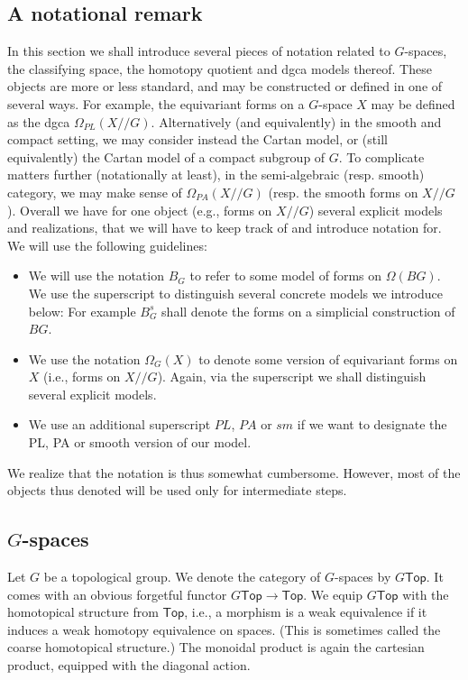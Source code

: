 \documentclass[a4paper]{amsart}
\theoremstyle{plain}
\theoremstyle{definition}
\renewcommand{\Top}{\mathsf{Top}}
\begin{document}
\subsection{A notational remark}
In this section we shall introduce several pieces of notation related to $G$-spaces, the classifying space, the homotopy quotient and dgca models thereof.
These objects are more or less standard, and may be constructed or defined in one of several ways.
For example, the equivariant forms on a $G$-space $X$ may be defined as the dgca $\Omega_{PL}(X//G)$. Alternatively (and equivalently) in the smooth and compact setting, we may consider instead the Cartan model, or (still equivalently) the Cartan model of a compact subgroup of $G$.
To complicate matters further (notationally at least), in the semi-algebraic (resp. smooth) category, we may make sense of $\Omega_{PA}(X//G)$ (resp. the smooth forms on $X//G$).
Overall we have for one object (e.g., forms on $X//G$) several explicit models and realizations, that we will have to keep track of and introduce notation for.
We will use the following guidelines:
\begin{itemize}
 \item We will use the notation $B_G$ to refer to some model of forms on $\Omega(BG)$. We use the superscript to distinguish several concrete models we introduce below: For example $B_G^s$ shall denote the forms on a simplicial construction of $BG$.
\item We use the notation $\Omega_G(X)$ to denote some version of equivariant forms on $X$ (i.e., forms on $X//G$). Again, via the superscript we shall distinguish several explicit models.
\item We use an additional superscript $PL$, $PA$ or $sm$ if we want to designate the PL, PA or smooth version of our model.
\end{itemize}

We realize that the notation is thus somewhat cumbersome.
However, most of the objects thus denoted will be used only for intermediate steps.


\subsection{\texorpdfstring{$G$}{G}-spaces}
Let $G$ be a topological group. We denote the category of $G$-spaces by $G\Top$.
It comes with an obvious forgetful functor $G\Top\to \Top$. We equip $G\Top$ with the homotopical structure from $\Top$, i.e., a morphism is a weak equivalence if it induces a weak homotopy equivalence on spaces. (This is sometimes called the coarse homotopical structure.)
The monoidal product is again the cartesian product, equipped with the diagonal action.
\end{document}

